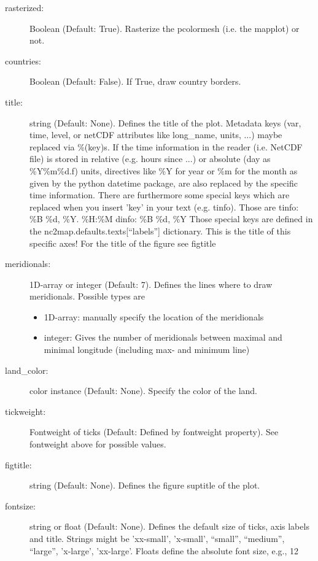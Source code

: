 \begin{description}
    \item[\gls*{rasterized}:] \label{item:rasterized}  Boolean (Default: True). Rasterize the pcolormesh (i.e. the mapplot) or not.
    \item[\gls*{countries}:] \label{item:countries}  Boolean (Default: False). If True, draw country borders.
    \item[\gls*{title}:] \label{item:title}  string (Default: None). Defines the title of the plot. Metadata keys (var, time, level, or netCDF attributes like long\_name, units, ...) maybe replaced via \%(key)s. If the time information in the reader (i.e. NetCDF file) is stored in relative (e.g. hours since ...) or absolute (day as \%Y\%m\%d.f) units, directives like \%Y for year or \%m for the month as given by the python datetime package, are also replaced by the specific time information. There are furthermore some special keys which are replaced when you insert '{key}' in your text (e.g. {tinfo}). Those are tinfo: \%B \%d, \%Y. \%H:\%M dinfo: \%B \%d, \%Y Those special keys are defined in the nc2map.defaults.texts[\enquote{labels}] dictionary. This is the title of this specific axes! For the title of the figure see figtitle
    \item[\gls*{meridionals}:] \label{item:meridionals}  1D-array or integer (Default: 7). Defines the lines where to draw meridionals. Possible types are
\begin{itemize}
    \item 1D-array: manually specify the location of the meridionals
    \item integer: Gives the number of meridionals between maximal and minimal longitude (including max- and minimum line)
\end{itemize}

    \item[\gls*{land_color}:] \label{item:land_color}  color instance (Default: None). Specify the color of the land. 
    \item[\gls*{tickweight}:] \label{item:tickweight}  Fontweight of ticks (Default: Defined by fontweight property). See fontweight above for possible values.
    \item[\gls*{figtitle}:] \label{item:figtitle}  string (Default: None). Defines the figure suptitle of the plot.
    \item[\gls*{fontsize}:] \label{item:fontsize}  string or float (Default: None). Defines the default size of ticks, axis labels and title. Strings might be 'xx-small', 'x-small', \enquote{small}, \enquote{medium}, \enquote{large}, 'x-large', 'xx-large'. Floats define the absolute font size, e.g., 12
\end{description}

